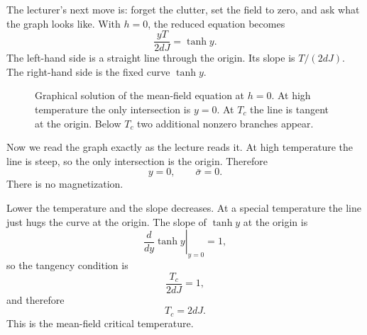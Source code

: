 The lecturer's next move is: forget the clutter, set the field to zero, and ask what the graph looks like. With \(h=0\), the reduced equation becomes
\begin{equation}
\frac{yT}{2dJ}=\tanh y.
\end{equation}
The left-hand side is a straight line through the origin. Its slope is \(T/(2dJ)\). The right-hand side is the fixed curve \(\tanh y\).

\begin{figure}[t]
\centering
{}
\caption{Graphical solution of the mean-field equation at \(h=0\). At high temperature the only intersection is \(y=0\). At \(T_c\) the line is tangent at the origin. Below \(T_c\) two additional nonzero branches appear.}
\end{figure}

Now we read the graph exactly as the lecture reads it. At high temperature the line is steep, so the only intersection is the origin. Therefore
\begin{equation}
y=0,
\qquad
\bar{\sigma}=0.
\end{equation}
There is no magnetization.

Lower the temperature and the slope decreases. At a special temperature the line just hugs the curve at the origin. The slope of \(\tanh y\) at the origin is
\begin{equation}
\left.\frac{d}{dy}\tanh y\right|_{y=0}=1,
\end{equation}
so the tangency condition is
\begin{equation}
\frac{T_c}{2dJ}=1,
\end{equation}
and therefore
\begin{equation}
T_c=2dJ.
\end{equation}
This is the mean-field critical temperature.

